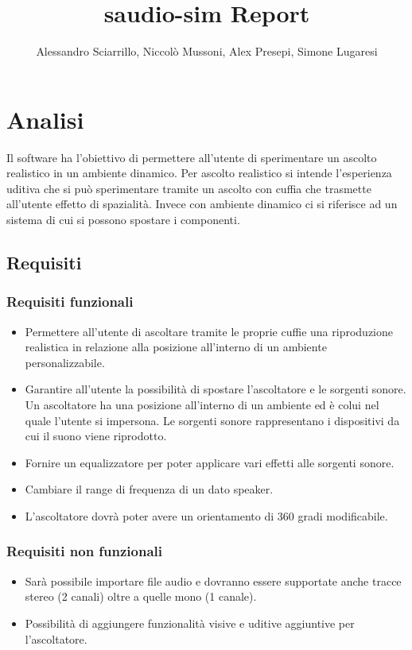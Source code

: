 \documentclass[a4paper,12pt]{report}
\title{saudio-sim Report}
\author{Alessandro Sciarrillo, Niccolò Mussoni, Alex Presepi, Simone Lugaresi}
\begin{document}
\maketitle

\tableofcontents
\chapter{Analisi}
Il software ha l'obiettivo di permettere all'utente di sperimentare un ascolto realistico in un ambiente dinamico.
%
Per ascolto realistico si intende l'esperienza uditiva che si può sperimentare tramite un ascolto con cuffia che trasmette all'utente effetto di spazialità.
%
Invece con ambiente dinamico ci si riferisce ad un sistema di cui si possono spostare i componenti.

\section{Requisiti}
\subsection*{Requisiti funzionali}
\begin{itemize}
	\item  Permettere all'utente di ascoltare tramite le proprie cuffie una riproduzione realistica in relazione alla posizione all'interno di un ambiente personalizzabile.
	\item Garantire all'utente la possibilità di spostare l'ascoltatore e le sorgenti sonore.
		Un ascoltatore ha una posizione all'interno di un ambiente ed è colui nel quale l'utente si impersona.
		Le sorgenti sonore rappresentano i dispositivi da cui il suono viene riprodotto. 
	\item Fornire un equalizzatore per poter applicare vari effetti alle sorgenti sonore.
	\item Cambiare il range di frequenza di un dato speaker.
	\item L'ascoltatore dovrà poter avere un orientamento di 360 gradi modificabile.
\end{itemize}
%
\subsection*{Requisiti non funzionali}
\begin{itemize}
	\item Sarà possibile importare file audio e dovranno essere supportate anche tracce stereo (2 canali) oltre a quelle mono (1 canale).
	\item Possibilità di aggiungere funzionalità visive e uditive aggiuntive per l'ascoltatore.
\end{itemize}
%
\end{document}
